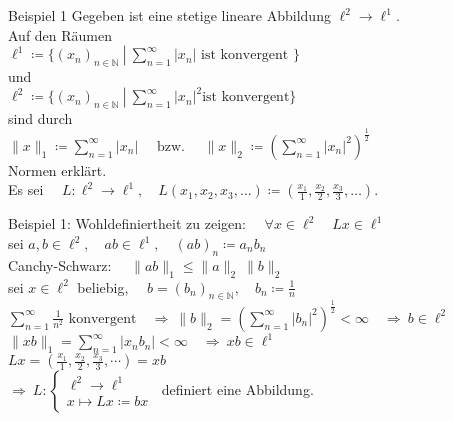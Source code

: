 \documentclass[AERbeamer%
,handout%
,optBeamerClassicFormat%
,optLeftEquations   %
]{AERlatex}
\begin{document}
    \begin{frame}{Beispiel 1}
        \setlength{\baselineskip}{1.3\baselineskip}
        Gegeben ist eine stetige lineare Abbildung $\ell^2 \rightarrow \ell^1$. \\
        Auf den Räumen \\
        $\ell^1\coloneqq \{\left(x_n\right)_{n \in \mathbb{N}} ~ \left| ~ \sum_{n=1}^{\infty} \right. |x_n| \text { ist konvergent }\}$ \\
        und \\
        $\ell^2\coloneqq \{\left(x_n\right)_{n \in \mathbb{N}} ~ \left| ~ \sum_{n=1}^{\infty} \right. \left|x_n\right|^2 \text{ist konvergent} \}$ \\
        sind durch \\
        $\|x\|_1\coloneqq\sum_{n=1}^{\infty}\left|x_n\right| \quad \text { bzw. } \quad\|x\|_2\coloneqq\left(\sum_{n=1}^{\infty}\left|x_n\right|^2\right)^{\frac{1}{2}}$ \\
        Normen erklärt. \\
        Es sei $\quad L: \ell^2 \rightarrow \ell^1, \quad L\left(x_1, x_2, x_3, \ldots\right)\coloneqq\left(\frac{x_1}{1}, \frac{x_2}{2}, \frac{x_3}{3}, \ldots\right)$.
    \end{frame}
%
    \begin{frame}{Beispiel 1: Wohldefiniertheit}
        \setlength{\baselineskip}{1.6\baselineskip}
        zu zeigen: $\quad \forall x \in \ell^2 \quad L x \in \ell^1$ \\ \pause
        sei $a, b \in \ell^2, \quad a b \in \ell^1, \quad (a b)_n\coloneqq a_n b_n$ \\ \pause
        Canchy-Schwarz: $\quad \|a b\|_1 \leq\|a\|_2~\|b\|_2$ \\ \pause
        sei $x \in \ell^2$ beliebig, $\quad b=\left(b_n\right)_{n \in \mathbb{N}}, \quad b_n\coloneqq\frac{1}{n}$ \\ \pause
        $\sum_{n=1}^{\infty} \frac{1}{n^2} \text { konvergent} \quad \Rightarrow ~\|b\|_2=\left(\sum_{n=1}^{\infty}\left|b_n\right|^2\right)^{\frac{1}{2}}<\infty \quad \Rightarrow ~ b \in \ell^2$ \\ \pause
        $\|x b\|_1=\sum_{n=1}^{\infty}\left|x_n b_n\right|<\infty \quad \Rightarrow ~ x b \in \ell^1$ \\ \pause
        $L x=\left(\frac{x_1}{1}, \frac{x_2}{2}, \frac{x_3}{3}, \cdots\right)=x b$ \\ \pause
        \vspace{0.5em}
        $\Rightarrow ~ L:\left\{\begin{array}{l}
                                    \ell^2 \rightarrow \ell^1 \\ x \mapsto L x\coloneqq b x
        \end{array}\right.~$  definiert eine Abbildung.
    \end{frame}
\end{document}

